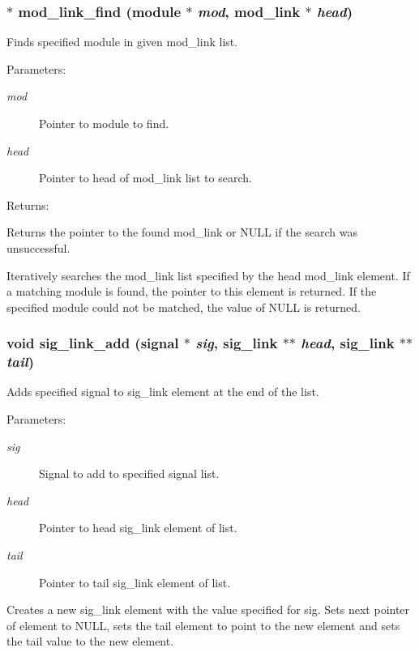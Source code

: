 \subsubsection{$\ast$ mod\_\-link\_\-find ({\bf module} $\ast$ {\em mod}, {\bf mod\_\-link} $\ast$ {\em head})}\label{link_8h_a14}


Finds specified module in given mod\_\-link list.

\begin{Desc}
\item[Parameters: ]\par
\begin{description}
\item[{\em 
mod}]Pointer to module to find. \item[{\em 
head}]Pointer to head of mod\_\-link list to search.\end{description}
\end{Desc}
\begin{Desc}
\item[Returns: ]\par
Returns the pointer to the found mod\_\-link or NULL if the search was unsuccessful.\end{Desc}
Iteratively searches the mod\_\-link list specified by the head mod\_\-link element. If a matching module is found, the pointer to this element is returned. If the specified module could not be matched, the value of NULL is returned. 
\subsubsection{\setlength{\rightskip}{0pt plus 5cm}void sig\_\-link\_\-add ({\bf signal} $\ast$ {\em sig}, {\bf sig\_\-link} $\ast$$\ast$ {\em head}, {\bf sig\_\-link} $\ast$$\ast$ {\em tail})}\label{link_8h_a3}


Adds specified signal to sig\_\-link element at the end of the list.

\begin{Desc}
\item[Parameters: ]\par
\begin{description}
\item[{\em 
sig}]Signal to add to specified signal list. \item[{\em 
head}]Pointer to head sig\_\-link element of list. \item[{\em 
tail}]Pointer to tail sig\_\-link element of list.\end{description}
\end{Desc}
Creates a new sig\_\-link element with the value specified for sig. Sets next pointer of element to NULL, sets the tail element to point to the new element and sets the tail value to the new element. 
